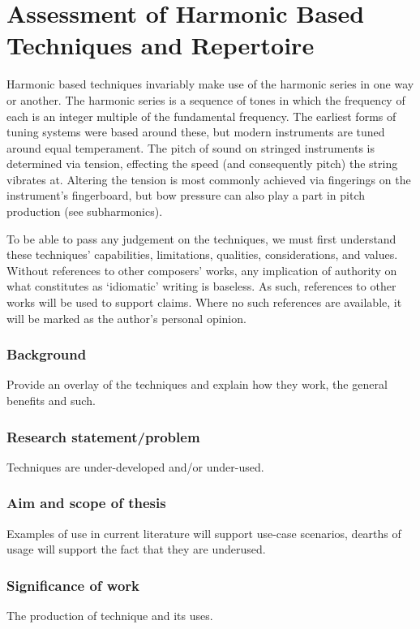 
\chapter{Assessment of Harmonic Based Techniques and Repertoire}

Harmonic based techniques invariably make use of the harmonic series in one way or another. The harmonic series is a sequence of tones in which the frequency of each is an integer multiple of the fundamental frequency. The earliest forms of tuning systems were based around these, but modern instruments are tuned around equal temperament. The pitch of sound on stringed instruments is determined via tension, effecting the speed (and consequently pitch) the string vibrates at. Altering the tension is most commonly achieved via fingerings on the instrument's fingerboard, but bow pressure can also play a part in pitch production (see subharmonics).

To be able to pass any judgement on the techniques, we must first understand these techniques' capabilities, limitations, qualities, considerations, and values. Without references to other composers' works, any implication of authority on what constitutes as `idiomatic' writing is baseless. As such, references to other works will be used to support claims. Where no such references are available, it will be marked as the author's personal opinion.

\subsection{Background}
Provide an overlay of the techniques and explain how they work, the general benefits and such.
\subsection{Research statement/problem}
Techniques are under-developed and/or under-used.

\subsection{Aim and scope of thesis}
Examples of use in current literature will support use-case scenarios, dearths of usage will support the fact that they are underused.

\subsection{Significance of work}
The production of technique and its uses.

